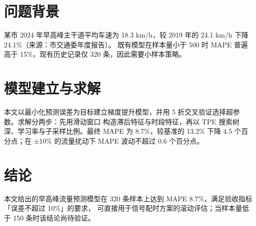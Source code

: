
\section{问题背景}

某市 2024 年早高峰主干道平均车速为 18.3 km/h，较 2019 年的 24.1 km/h 下降 24.1\%（来源：市交通委年度报告）。
既有模型在样本量小于 500 时 MAPE 普遍高于 15\%，现有历史记录仅 320 条，因此需要小样本策略。

\section{模型建立与求解}

本文以最小化预测误差为目标建立梯度提升模型，并用 5 折交叉验证选择超参数。求解分两步：先用滑动窗口
构造滞后特征与时段特征，再以 TPE 搜索树深、学习率与子采样比例。最终 MAPE 为 8.7\%，较基准的 13.2\%
下降 4.5 个百分点；在 ±10\% 的流量扰动下 MAPE 波动不超过 0.6 个百分点。

\section{结论}

本文给出的早高峰流量预测模型在 320 条样本上达到 MAPE 8.7\%，满足验收指标「误差不超过 10\%」的要求，
可直接用于信号配时方案的滚动评估；当样本量低于 150 条时该结论尚待验证。
